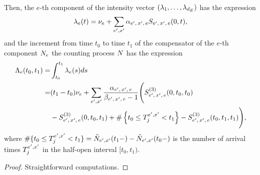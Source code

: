 \documentclass[10pt, article,table]{article}
\begin{document}
\begin{prop}
\begin{equation}
\begin{split}
  \end{split}
 \end{equation}
 Then, the $e$-th component of the intensity vector $(\intensity[1],\dots,\intensity[\numEventTypes])$ has the expression
 \begin{equation}\label{eq.intensity_powerlaw}
  \intensity[e](t) = \baseRate_e +\sum_{\eone,\xone}\impCoef\subscriptexe\ESSE\subscriptexe(0,t),
 \end{equation}
and the increment from time $t_0$ to time $t_1$ of the compensator of the $e$-th component $\countingProc$ the counting process $\multiCountingProc$ has the expression
\begin{equation}\label{eq.eval_compensator_powerlaw}
\begin{split}
 \compensator_e(t_0,t_1)=&\int_{t_0}^{t_1} \intensity[e](s)ds
 \\
 =&
 (t_1 - t_0)\baseRate_e
 + \sum_{\eone,\xone} \frac{\impCoef\subscriptexe}{\decCoef\subscriptexe - 1}
 \Bigg(
 \ESSEthree\subscriptexe(0,t_0,t_0) 
 \\
 & - \ESSEthree\subscriptexe(0,t_0,t_1)
 +\# \left\lbrace t_0 \leq \arrivalTimes[\eone,\xone]_j <t_1\right\rbrace
 - \ESSEthree\subscriptexe(t_0,t_1,t_1)
 \Bigg),
\end{split} 
\end{equation}
where $\# \lbrace t_0 \leq \arrivalTimes[\eone,\xone]_j <t_1\rbrace = \hybridHawkes_{\eone,\xone}(t_1 -)-\hybridHawkes_{\eone,\xone}(t_0-)$ is the number of arrival times $\arrivalTimes[\eone,\xone]_j$ in the half-open interval $[t_0,t_1)$. 
\end{prop}
\begin{proof}
 Straightforward computations. 
\end{proof}
\end{document}
